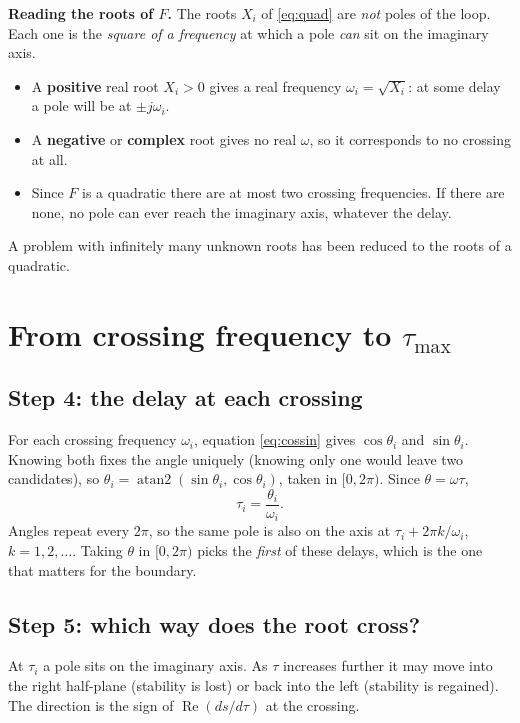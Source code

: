 \documentclass[11pt,a4paper]{article}
\theoremstyle{definition}
\begin{document}
\textbf{Reading the roots of $F$.} The roots $X_i$ of \eqref{eq:quad}
are \emph{not} poles of the loop. Each one is the \emph{square of a
frequency} at which a pole \emph{can} sit on the imaginary axis.
\begin{itemize}\setlength{\itemsep}{2pt}
\item A \textbf{positive} real root $X_i > 0$ gives a real frequency
$\omega_i = \sqrt{X_i}$: at some delay a pole will be at $\pm j\omega_i$.
\item A \textbf{negative} or \textbf{complex} root gives no real
$\omega$, so it corresponds to no crossing at all.
\item Since $F$ is a quadratic there are at most two crossing
frequencies. If there are none, no pole can ever reach the imaginary
axis, whatever the delay.
\end{itemize}
A problem with infinitely many unknown roots has been reduced to the
roots of a quadratic.

\section{From crossing frequency to \texorpdfstring{$\tau_{\max}$}{tau max}}
\label{sec:taumax}

\subsection{Step 4: the delay at each crossing}
For each crossing frequency $\omega_i$, equation \eqref{eq:cossin} gives
$\cos\theta_i$ and $\sin\theta_i$. Knowing both fixes the angle
uniquely (knowing only one would leave two candidates), so
$\theta_i = \operatorname{atan2}(\sin\theta_i, \cos\theta_i)$, taken in
$[0, 2\pi)$. Since $\theta = \omega\tau$,
\begin{equation}
\tau_i = \frac{\theta_i}{\omega_i}.
\end{equation}
Angles repeat every $2\pi$, so the same pole is also on the axis at
$\tau_i + 2\pi k/\omega_i$, $k = 1, 2, \dots$. Taking $\theta$ in
$[0, 2\pi)$ picks the \emph{first} of these delays, which is the one
that matters for the boundary.

\subsection{Step 5: which way does the root cross?}
At $\tau_i$ a pole sits on the imaginary axis. As $\tau$ increases
further it may move into the right half-plane (stability is lost) or
back into the left (stability is regained). The direction is the sign of
$\operatorname{Re}(ds/d\tau)$ at the crossing.
\end{document}
